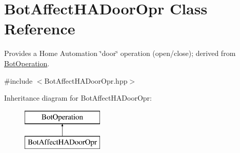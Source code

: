 \hypertarget{classBotAffectHADoorOpr}{\section{Bot\-Affect\-H\-A\-Door\-Opr Class Reference}
\label{classBotAffectHADoorOpr}
}


Provides a Home Automation \char`\"{}door\char`\"{} operation (open/close); derived from \hyperlink{classBotOperation}{Bot\-Operation}.  




{\ttfamily \#include $<$Bot\-Affect\-H\-A\-Door\-Opr.\-hpp$>$}

Inheritance diagram for Bot\-Affect\-H\-A\-Door\-Opr\-:\begin{figure}[H]
\begin{center}
\leavevmode
\includegraphics[height=2.000000cm]{classBotAffectHADoorOpr}
\end{center}
\end{figure}
